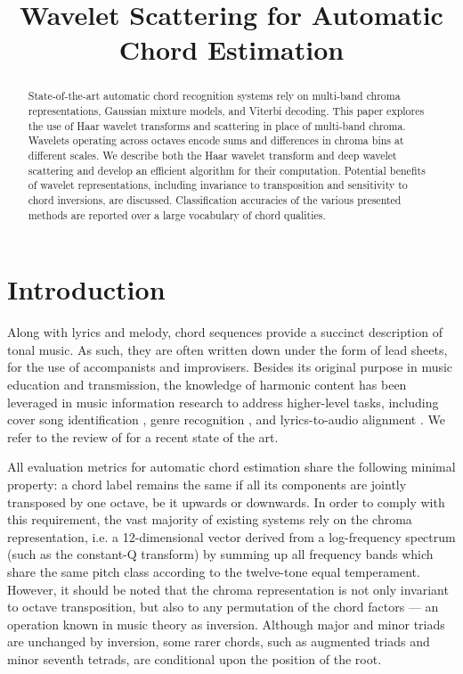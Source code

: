 \documentclass{article}
\title{Wavelet Scattering for Automatic Chord Estimation}
\makeatletter
\newcommand*{\ie}{i.e.\@\xspace}
\makeatother
\begin{document}
%
\maketitle
%
\begin{abstract}
State-of-the-art automatic chord recognition systems rely on multi-band chroma representations,
Gaussian mixture models, and Viterbi decoding.
This paper explores the use of Haar wavelet transforms and scattering in place of multi-band
chroma. Wavelets operating across octaves encode sums and differences in chroma bins at
different scales.
We describe both the Haar wavelet transform and deep wavelet scattering and develop an
efficient algorithm for their computation. Potential benefits of wavelet representations,
including invariance to transposition and sensitivity to chord inversions, are discussed.
Classification accuracies of the various presented methods are reported over a large
vocabulary of chord qualities.
\end{abstract}

\section{Introduction}\label{sec:introduction}
Along with lyrics and melody, chord sequences provide a succinct description of tonal music.
As such, they are often written down under the form of lead sheets, for the use of
accompanists and improvisers.
Besides its original purpose in music education and transmission, the knowledge of
harmonic content has been leveraged in music information research to address higher-level
tasks, including cover song identification \cite{ellis2007identifying},
genre recognition \cite{perez2009genre}, and lyrics-to-audio alignment
\cite{mauch2012integrating}. We refer to the review of
\cite{mcvicar2014automatic} for a recent state of the art.

All evaluation metrics for automatic
chord estimation share the following minimal property:
a chord label remains the same if all its components are jointly
transposed by one octave, be it upwards or downwards.
In order to comply with this requirement, the vast majority of existing
systems rely on the chroma representation, \ie a 12-dimensional vector
derived from a log-frequency spectrum
(such as the constant-Q transform) by summing up all
frequency bands which share the same pitch class according to
the twelve-tone equal temperament.
However, it should be noted that the chroma representation is not
only invariant to octave transposition, but also to any permutation
of the chord factors --- an operation known in music theory
as inversion.
Although major and minor triads are unchanged by inversion,
some rarer chords, such as augmented triads and minor seventh
tetrads, are conditional upon the position of the root.
\end{document}
